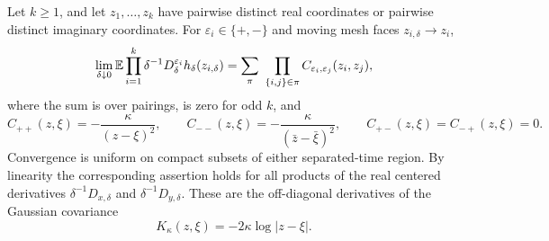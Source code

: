 \begin{proposition}\label{prop:gaussian-currents}
Let $k\ge1$, and let $z_1,\ldots,z_k$ have pairwise distinct real
coordinates or pairwise distinct imaginary coordinates. For
$\varepsilon_i\in\{+,-\}$ and moving mesh faces $z_{i,\delta}\to z_i$,
\begin{equation}\label{eq:chiral-Gaussian-current-limit}
 \lim_{\delta\downarrow0}
 \mathbb E\prod_{i=1}^k
       \delta^{-1}D_\delta^{\varepsilon_i}h_\delta(z_{i,\delta})
   =\sum_{\pi}\ \prod_{\{i,j\}\in\pi}
                  C_{\varepsilon_i,\varepsilon_j}(z_i,z_j),
\end{equation}
where the sum is over pairings, is zero for odd $k$, and
\begin{equation}\label{eq:chiral-contractions}
 C_{++}(z,\xi)=-\frac{\kappa}{(z-\xi)^2},\qquad
 C_{--}(z,\xi)=-\frac{\kappa}{(\bar z-\bar\xi)^2},\qquad
 C_{+-}(z,\xi)=C_{-+}(z,\xi)=0.
\end{equation}
Convergence is uniform on compact subsets of either separated-time
region. By linearity the corresponding assertion holds for all products
of the real centered derivatives $\delta^{-1}D_{x,\delta}$ and
$\delta^{-1}D_{y,\delta}$. These are the off-diagonal derivatives of the
Gaussian covariance
\begin{equation}\label{eq:chiral-log-covariance}
                              K_\kappa(z,\xi)=-2\kappa\log|z-\xi|.
\end{equation}
\end{proposition}

